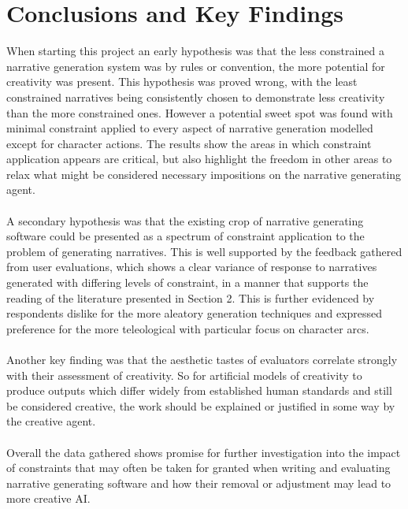 \documentclass[letterpaper]{article}
\begin{document}
\section{Conclusions and Key Findings}
When starting this project an early hypothesis was that the less constrained a narrative generation system was by rules or convention, the more potential for creativity was present. This hypothesis was proved wrong, with the least constrained narratives being consistently chosen to demonstrate less creativity than the more constrained ones. However a potential sweet spot was found with minimal constraint applied to every aspect of narrative generation modelled except for character actions. The results show the areas in which constraint application appears are critical, but also highlight the freedom in other areas to relax what might be considered necessary impositions on the narrative generating agent.\\
\\A secondary hypothesis was that the existing crop of narrative generating software could be presented as a spectrum of constraint application to the problem of generating narratives. This is well supported by the feedback gathered from user evaluations, which shows a clear variance of response to narratives generated with differing levels of constraint, in a manner that supports the reading of the literature presented in Section 2. This is further evidenced by respondents dislike for the more aleatory generation techniques and expressed preference for the more teleological with particular focus on character arcs.\\
\\Another key finding was that the aesthetic tastes of evaluators correlate strongly with their assessment of creativity. So for artificial models of creativity to produce outputs which differ widely from established human standards and still be considered creative, the work should be explained or justified in some way by the creative agent.\\
\\Overall the data gathered shows promise for further investigation into the impact of constraints that may often be taken for granted when writing and evaluating narrative generating software and how their removal or adjustment may lead to more creative AI. 


\end{document}
